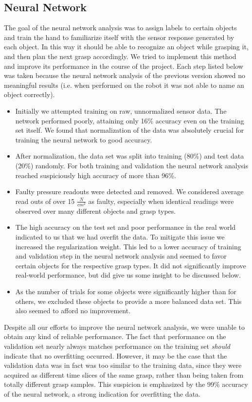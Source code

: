 \subsection*{Neural Network}
The goal of the neural network analysis was to assign labels to certain objects and train the hand to familiarize itself with the sensor response generated by each object. In this way it should be able to recognize an object while grasping it, and then plan the next grasp accordingly. We tried to implement this method and improve its performance in the course of the project. Each step listed below was taken because the neural network analysis of the previous version showed no meaningful results (i.e. when performed on the robot it was not able to name an object correctly).
\begin{itemize}
\item Initially we attempted training on raw, unnormalized sensor data. The network performed poorly, attaining only 16\% accuracy even on the training set itself. We found that normalization of the data was absolutely crucial for training the neural network to good accuracy.
\item After normalization, the data set was split into training (80\%) and test data (20\%) randomly. For both training and validation the neural network analysis reached suspiciously high accuracy of more than 96\%. 
\item Faulty pressure readouts were detected and removed. We considered average read outs of over 15 $\frac{N}{cm^2}$ as faulty, especially when identical readings were observed over many different objects and grasp types.
\item The high accuracy on the test set and poor performance in the real world indicated to us that we had overfit the data. To mitigate this issue we increased the regularization weight. This led to a lower accuracy of training and validation step in the neural network analysis and seemed to favor certain objects for the respective grasp types. It did not significantly improve real-world performance, but did give us some insight to be discussed below.
\item As the number of trials for some objects were significantly higher than for others, we excluded these objects to provide a more balanced data set. This also seemed to afford no improvement.
\end{itemize}
Despite all our efforts to improve the neural network analysis, we were unable to obtain any kind of reliable performance. The fact that performance on the validation set nearly always matches performance on the training set \emph{should} indicate that no overfitting occurred. However, it may be the case that the validation data was in fact was too similar to the training data, since they were acquired as different time slices of the same grasp, rather than being taken from totally different grasp samples. This suspicion is emphasized by the 99\% accuracy of the neural network, a strong indication for overfitting the data.

